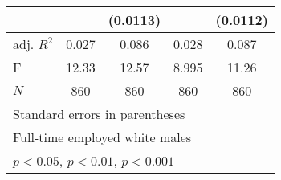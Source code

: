 {\begin{tabular}{l*{4}{c}}
            &                     &    (0.0113)         &                     &    (0.0112)         \\
\hline
adj. \(R^{2}\)&       0.027         &       0.086         &       0.028         &       0.087         \\
F           &       12.33         &       12.57         &       8.995         &       11.26         \\
\(N\)       &         860         &         860         &         860         &         860         \\
\hline\hline
\multicolumn{5}{l}{\footnotesize Standard errors in parentheses}\\
\multicolumn{5}{l}{\footnotesize Full-time employed white males}\\
\multicolumn{5}{l}{\footnotesize \sym{*} \(p<0.05\), \sym{**} \(p<0.01\), \sym{***} \(p<0.001\)}\\
\end{tabular}
}
